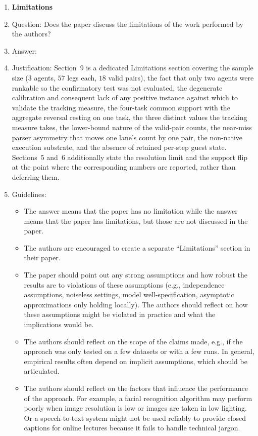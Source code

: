 \begin{enumerate}
\item {\bf Limitations}
    \item[] Question: Does the paper discuss the limitations of the work performed by the authors?
    \item[] Answer: \answerYes{}
    \item[] Justification: Section~9 is a dedicated Limitations section covering the sample size ($3$ agents, $57$ legs each, $18$ valid pairs), the fact that only two agents were rankable so the confirmatory test was not evaluated, the degenerate calibration and consequent lack of any positive instance against which to validate the tracking measure, the four-task common support with the aggregate reversal resting on one task, the three distinct values the tracking measure takes, the lower-bound nature of the valid-pair counts, the near-miss parser asymmetry that moves one lane's count by one pair, the non-native execution substrate, and the absence of retained per-step guest state. Sections~5 and~6 additionally state the resolution limit and the support flip at the point where the corresponding numbers are reported, rather than deferring them.
    \item[] Guidelines:
    \begin{itemize}
        \item The answer \answerNA{} means that the paper has no limitation while the answer \answerNo{} means that the paper has limitations, but those are not discussed in the paper. 
        \item The authors are encouraged to create a separate ``Limitations'' section in their paper.
        \item The paper should point out any strong assumptions and how robust the results are to violations of these assumptions (e.g., independence assumptions, noiseless settings, model well-specification, asymptotic approximations only holding locally). The authors should reflect on how these assumptions might be violated in practice and what the implications would be.
        \item The authors should reflect on the scope of the claims made, e.g., if the approach was only tested on a few datasets or with a few runs. In general, empirical results often depend on implicit assumptions, which should be articulated.
        \item The authors should reflect on the factors that influence the performance of the approach. For example, a facial recognition algorithm may perform poorly when image resolution is low or images are taken in low lighting. Or a speech-to-text system might not be used reliably to provide closed captions for online lectures because it fails to handle technical jargon.

\end{itemize}
\end{enumerate}

